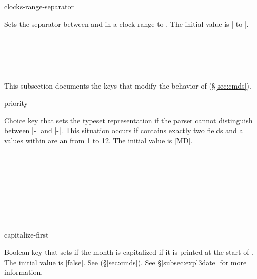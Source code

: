 \documentclass{beerydoc}
\begin{document}
\begin{codedoc}{clocks-range-separator}
  \begin{syntax}
  \end{syntax}
  Sets the separator between  and  in a clock range
  to .
  The initial value is | to |.
  \begin{codedemo}
    \\
    \\
    \\
  \end{codedemo}
\end{codedoc}

\subsection{}
\label{subsec:date}

This subsection documents the keys that modify the behavior of
 (\S\ref{sec:cmds}).

\begin{codedoc}{priority}
  \begin{syntax}
  \end{syntax}
  Choice key that sets the typeset representation if the parser cannot
  distinguish between |-| and
  |-|.
  This situation occurs if  contains exactly two fields and all
  values within are an  from \num{1} to \num{12}.
  The initial value is |MD|.
  \begin{codedemo}
    \\
    \\
    \\
    \\
    \\
    \\
    \\
  \end{codedemo}
\end{codedoc}

\begin{codedoc}{capitalize-first}
  \begin{syntax}
  \end{syntax}
  Boolean key that sets if the month is capitalized if it is printed at the
  start of .
  The initial value is |false|.
  See  (\S\ref{sec:cmds}).
  See \S\ref{subsec:expl3date} for more information.
\end{codedoc}
\end{document}

